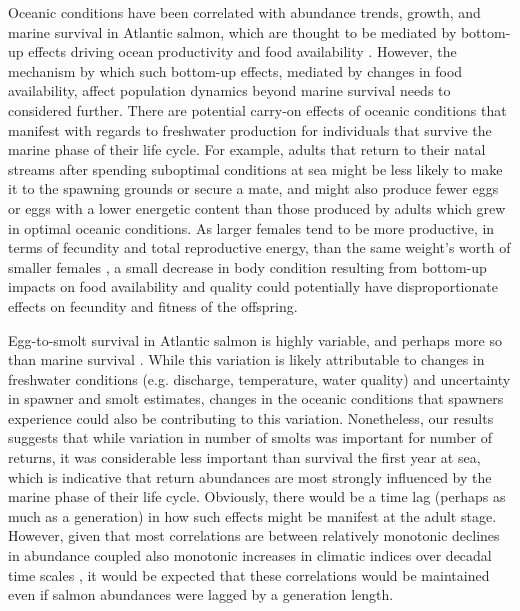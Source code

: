 \documentclass[12pt]{article}
\begin{document}
Oceanic conditions have been correlated with abundance trends, growth, and marine survival
in Atlantic salmon, which are thought
to be mediated by bottom-up effects driving ocean productivity and food availability
 \citep{Todd2008, Renkawitz2015,Olmos2020}. 
However, the mechanism by which such bottom-up effects,
mediated by changes in food availability,
affect population dynamics beyond marine survival needs to
considered further. 
There are potential carry-on effects of oceanic
conditions that manifest with regards to freshwater production for individuals that survive
the marine phase of their life cycle. 
For example, adults
that return to their natal streams after spending suboptimal conditions at sea might be less
likely to make it to the spawning grounds or secure a mate, and might also
produce fewer eggs or eggs with a lower energetic content than those
produced by adults which grew in optimal oceanic conditions.
As larger females tend to be more productive, in terms of fecundity and total
reproductive energy, than the same weight's worth of smaller females
\citep{Barneche2018}, a small decrease in body condition resulting from bottom-up
impacts on food availability and quality could potentially have
disproportionate effects on fecundity and fitness of the offspring.


Egg-to-smolt survival in Atlantic salmon is highly variable, and perhaps more so
than marine survival \citep{Klemetsen2003,Chaput2015}.
While this variation is likely attributable to changes in freshwater
conditions (e.g. discharge, temperature, water quality) and uncertainty in
spawner and smolt estimates, 
changes in the oceanic conditions that spawners experience could also be
contributing to this variation.
Nonetheless, our results suggests that while variation in number of smolts was 
important for number of returns, it was considerable less important than
survival the first year at sea, which is indicative that return abundances 
are most strongly influenced by the marine phase of their life cycle.
Obviously, there would be a time lag (perhaps as much as a generation) in how such effects
might be manifest at the adult stage.
However, given that most correlations are between relatively monotonic declines
in abundance coupled also monotonic increases in climatic indices
over decadal time scales \citep[e.g.,][]{Friedland1998, Todd2008,
    Beaugrand2012}, it would be expected that these correlations would be
maintained even if salmon abundances were lagged by a generation length.
\end{document}
